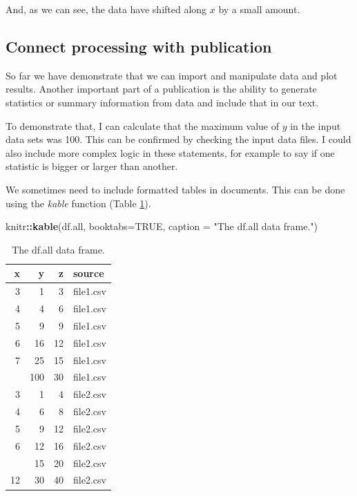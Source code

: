 \documentclass[11pt,]{article}
\newenvironment{Shaded}{\begin{snugshade}}{\end{snugshade}}
\newcommand{\DataTypeTok}[1]{\textcolor[rgb]{0.13,0.29,0.53}{#1}}
\newcommand{\KeywordTok}[1]{\textcolor[rgb]{0.13,0.29,0.53}{\textbf{#1}}}
\newcommand{\NormalTok}[1]{#1}
\newcommand{\OperatorTok}[1]{\textcolor[rgb]{0.81,0.36,0.00}{\textbf{#1}}}
\newcommand{\OtherTok}[1]{\textcolor[rgb]{0.56,0.35,0.01}{#1}}
\newcommand{\StringTok}[1]{\textcolor[rgb]{0.31,0.60,0.02}{#1}}
\begin{document}
And, as we can see, the data have shifted along \(x\) by a small amount.

\hypertarget{connect-processing-with-publication}{%
\subsection{Connect processing with publication}\label{connect-processing-with-publication}}

So far we have demonstrate that we can import and manipulate data and plot results. Another important part of a publication is the ability to generate statistics or summary information from data and include that in our text.

To demonstrate that, I can calculate that the maximum value of \(y\) in the input data sets was 100. This can be confirmed by checking the input data files. I could also include more complex logic in these statements, for example to say if one statistic is bigger or larger than another.

We sometimes need to include formatted tables in documents. This can be done using the \emph{kable} function (Table \ref{tab:dfall}).

\begin{Shaded}
\begin{Highlighting}[]
\NormalTok{knitr}\OperatorTok{::}\KeywordTok{kable}\NormalTok{(df.all,}
             \DataTypeTok{booktabs=}\OtherTok{TRUE}\NormalTok{,}
             \DataTypeTok{caption =} \StringTok{"The df.all data frame."}\NormalTok{)}
\end{Highlighting}
\end{Shaded}

\begin{table}[t]

\caption{\label{tab:dfall}The df.all data frame.}
\centering
\begin{tabular}{rrrl}
\toprule
x & y & z & source\\
\midrule
3 & 1 & 3 & file1.csv\\
4 & 4 & 6 & file1.csv\\
5 & 9 & 9 & file1.csv\\
6 & 16 & 12 & file1.csv\\
7 & 25 & 15 & file1.csv\\
\addlinespace
12 & 100 & 30 & file1.csv\\
3 & 1 & 4 & file2.csv\\
4 & 6 & 8 & file2.csv\\
5 & 9 & 12 & file2.csv\\
6 & 12 & 16 & file2.csv\\
\addlinespace
7 & 15 & 20 & file2.csv\\
12 & 30 & 40 & file2.csv\\
\bottomrule
\end{tabular}
\end{table}
\end{document}
